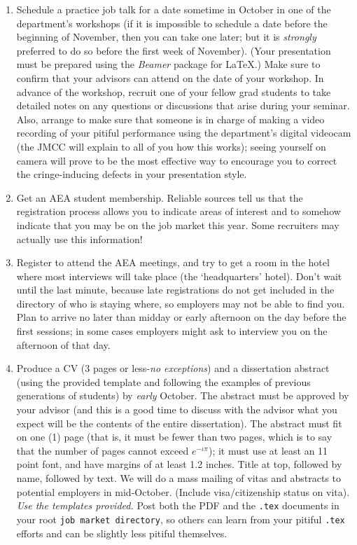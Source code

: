 \documentclass{econtex}
\begin{document}
\begin{enumerate}
\item Schedule a practice job talk for a date sometime in October in
  one of the department's workshops (if it is impossible to schedule a
  date before the beginning of November, then you can take one later;
  but it is {\it strongly} preferred to do so before the first week of
  November).  (Your presentation must be prepared using the {\it
    Beamer} package for {\LaTeX}.)  Make sure to confirm that your
  advisors can attend on the date of your workshop.  In advance of the
  workshop, recruit one of your fellow grad students to take detailed
  notes on any questions or discussions that arise during your
  seminar.  Also, arrange to make sure that someone is in charge of
  making a video recording of your pitiful performance using the
  department's digital videocam (the JMCC will explain to all of you how this works); seeing yourself on camera will prove
  to be the most effective way to encourage you to correct the cringe-inducing defects in
  your presentation style.
  
\item Get an AEA student membership.  Reliable sources tell us that
  the registration process allows you to indicate areas of interest
  and to somehow indicate that you may be on the job market this year.
  Some recruiters may actually use this information!
  
\item Register to attend the AEA meetings, and try to get a room in
  the hotel where most interviews will take place (the `headquarters'
  hotel).  Don't wait until the last minute, because late
  registrations do not get included in the directory of who is staying
  where, so employers may not be able to find you.  Plan to arrive no
  later than midday or early afternoon on the day before the first
  sessions; in some cases employers might ask to interview you on the
  afternoon of that day.
  
\item Produce a CV (3 pages or less-{\it no exceptions}) and a
  dissertation abstract (using the provided template and following the
  examples of previous generations of students) by {\it early} October.  The
  abstract must be approved by your advisor (and this is a good time
  to discuss with the advisor what you expect will be the contents of
  the entire dissertation).  The abstract must fit on one (1) page
  (that is, it must be fewer than two pages, which is to say that the
  number of pages cannot exceed $e^{-\iota \pi}$); it must use at
  least an 11 point font, and have margins of at least 1.2 inches.  Title at
  top, followed by name, followed by text.  We will do a mass mailing
  of vitas and abstracts to potential employers in mid-October.
  (Include visa/citizenship status on vita).  {\it Use the templates
    provided.}  Post both the PDF and the \texttt{.tex} documents in
  your root \texttt{job market directory}, so others can learn from your pitiful
  \texttt{.tex} efforts and can be slightly less pitiful themselves.


\end{enumerate}
\end{document}
